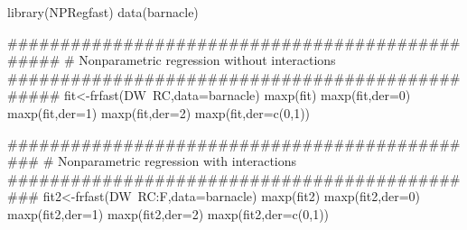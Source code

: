 %
\begin{Examples}
\begin{ExampleCode}

library(NPRegfast)
data(barnacle)

################################################
# Nonparametric regression without interactions
################################################
fit<-frfast(DW~RC,data=barnacle)
maxp(fit)
maxp(fit,der=0)
maxp(fit,der=1)
maxp(fit,der=2)
maxp(fit,der=c(0,1))

##############################################
# Nonparametric regression with interactions
##############################################
fit2<-frfast(DW~RC:F,data=barnacle)
maxp(fit2)
maxp(fit2,der=0)
maxp(fit2,der=1)
maxp(fit2,der=2)
maxp(fit2,der=c(0,1))
\end{ExampleCode}
\end{Examples}


